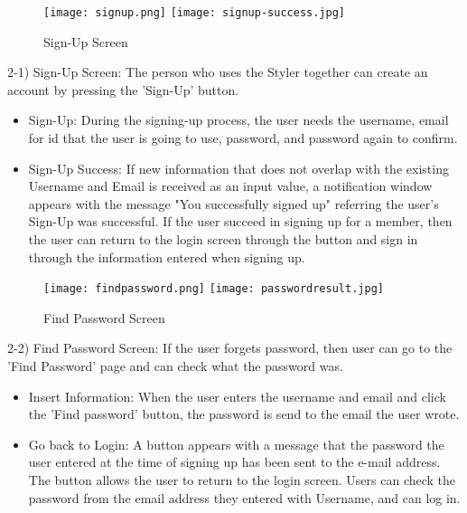 \documentclass[conference]{IEEEtran}
\begin{document}
\begin{figure}[htbp]
\centerline{
\texttt{[image: signup.png]}
\texttt{[image: signup-success.jpg]}
}
\caption{Sign-Up Screen}
\label{fig}
\end{figure}
2-1) Sign-Up Screen: The person who uses the Styler together can create an account by pressing the 'Sign-Up' button.
\begin{itemize}
    \item Sign-Up: During the signing-up process, the user needs the username, email for id that the user is going to use, password, and password again to confirm.
    \item Sign-Up Success: If new information that does not overlap with the existing Username and Email is received as an input value, a notification window appears with the message "You successfully signed up" referring the user's Sign-Up was successful. If the user succeed in signing up for a member, then the user can return to the login screen through the button and sign in through the information entered when signing up.\\
\end{itemize}

\begin{figure}[htbp]
\centerline{
\texttt{[image: findpassword.png]}
\texttt{[image: passwordresult.jpg]}
}
\caption{Find Password Screen}
\label{fig}
\end{figure}
2-2) Find Password Screen: If the user forgets password, then user can go to the 'Find Password' page and can check what the password was. \\
\begin{itemize}
    \item Insert Information: When the user enters the username and email and click the 'Find password' button, the password is send to the email the user wrote.\\
    \item Go back to Login: A button appears with a message that the password the user entered at the time of signing up has been sent to the e-mail address. The button allows the user to return to the login screen. Users can check the password from the email address they entered with Username, and can log in.\\
\end{itemize}
\end{document}
